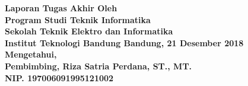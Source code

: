 \clearpage
\pagestyle{empty}

\begin{center}
\smallskip
    \Large \bfseries \MakeUppercase{\thetitle}
    \vfill
    \Large Laporan Tugas Akhir
    \vfill
    \large Oleh
    \Large \theauthor \\
    \large Program Studi Teknik Informatika \\ Sekolah Teknik Elektro dan Informatika \\ Institut Teknologi Bandung
    \vfill
    \normalsize \normalfont
    \vfill
    Bandung, 21 Desember 2018 \\
    Mengetahui, \\
    Pembimbing,
    \vfill
    \vfill
    \vfill
    Riza Satria Perdana, ST., MT. \\
    NIP. 197006091995121002
\end{center}
\clearpage
